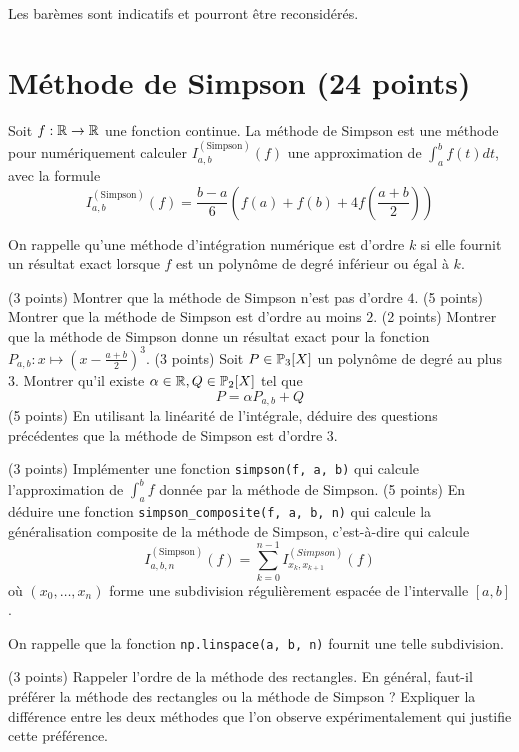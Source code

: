 
Les barèmes sont indicatifs et pourront être reconsidérés.

\section*{Méthode de Simpson (24 points)}

Soit $ f : \R \rightarrow \R $ une fonction continue. La méthode de Simpson est une méthode pour numériquement calculer $ I^{(\textrm{Simpson})}_{a, b}(f) $ une approximation de $ \int_{a}^{b} f(t)dt $, avec la formule \[
    I^{(\textrm{Simpson})}_{a, b}(f) = \frac{b-a}{6} (f(a) + f(b) + 4 f(\frac{a+b}{2}))
\]

On rappelle qu'une méthode d'intégration numérique est d'ordre $ k $ si elle fournit un résultat exact lorsque $ f $ est un polynôme de degré inférieur ou égal à $ k $.

\ques (3 points) Montrer que la méthode de Simpson n'est pas d'ordre $ 4 $.
\ques (5 points) Montrer que la méthode de Simpson est d'ordre au moins $ 2 $.
\quessques (2 points) Montrer que la méthode de Simpson donne un résultat exact pour la fonction $ P_{a,b} : x \mapsto (x - \frac{a+b}{2})^3 $.
\ssques  (3 points) Soit $ P \in \P_3[X] $ un polynôme de degré au plus $ 3 $. Montrer qu'il existe $ \alpha \in \R, Q \in \P_2[X] $ tel que \[
    P = \alpha P_{a, b} + Q
\]
\ques (5 points) En utilisant la linéarité de l'intégrale, déduire des questions précédentes que la méthode de Simpson est d'ordre $ 3 $.

\quessques (3 points) Implémenter une fonction \texttt{simpson(f, a, b)} qui calcule l'approximation de $ \int_{a}^{b} f $ donnée par la méthode de Simpson.
\ssques (5 points) En déduire une fonction \texttt{simpson_composite(f, a, b, n)} qui calcule la généralisation composite de la méthode de Simpson, c'est-à-dire qui calcule \[
    I^{(\textrm{Simpson})}_{a, b, n}(f) = \sum_{k=0}^{n-1} I^{(Simpson)}_{x_k, x_{k+1}}(f)
\]
où $ (x_0, \ldots, x_n) $ forme une subdivision régulièrement espacée de l'intervalle $ [a, b] $. 

On rappelle que la fonction \texttt{np.linspace(a, b, n)} fournit une telle subdivision.

\ques (3 points) Rappeler l'ordre de la méthode des rectangles. En général, faut-il préférer la méthode des rectangles ou la méthode de Simpson ? Expliquer la différence entre les deux méthodes que l'on observe expérimentalement qui justifie cette préférence.


